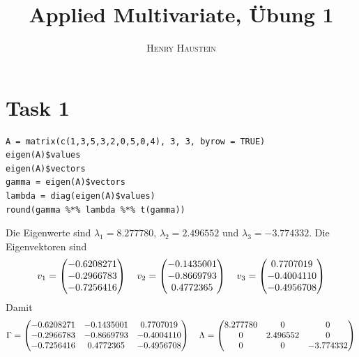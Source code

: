 \documentclass{article}
\title{\textbf{Applied Multivariate, Übung 1}}
\author{\textsc{Henry Haustein}}
\date{}
\begin{document}
	\maketitle
	
	\section*{Task 1}
	\begin{lstlisting}
A = matrix(c(1,3,5,3,2,0,5,0,4), 3, 3, byrow = TRUE)
eigen(A)$values
eigen(A)$vectors
gamma = eigen(A)$vectors
lambda = diag(eigen(A)$values)
round(gamma %*% lambda %*% t(gamma))
	\end{lstlisting}
	Die Eigenwerte sind $\lambda_1 = 8.277780$, $\lambda_2 = 2.496552$ und $\lambda_3 = -3.774332$. Die Eigenvektoren sind
	\begin{align}
		v_1 = \begin{pmatrix}
			-0.6208271 \\ -0.2966783 \\ -0.7256416
		\end{pmatrix} \quad v_2 = \begin{pmatrix}
			-0.1435001 \\ -0.8669793 \\ 0.4772365
		\end{pmatrix} \quad v_3 = \begin{pmatrix}
			0.7707019 \\ -0.4004110 \\ -0.4956708
		\end{pmatrix} \notag
	\end{align}
	Damit
	\begin{align}
		\Gamma = \begin{pmatrix}
			-0.6208271 & -0.1435001 & 0.7707019 \\ 
			-0.2966783 & -0.8669793 & -0.4004110 \\ 
			-0.7256416 & 0.4772365 & -0.4956708
		\end{pmatrix} \quad \Lambda = \begin{pmatrix}
			8.277780 & 0 & 0 \\
			0 & 2.496552 & 0 \\
			0 & 0 & -3.774332
		\end{pmatrix} \notag
	\end{align}
\end{document}
